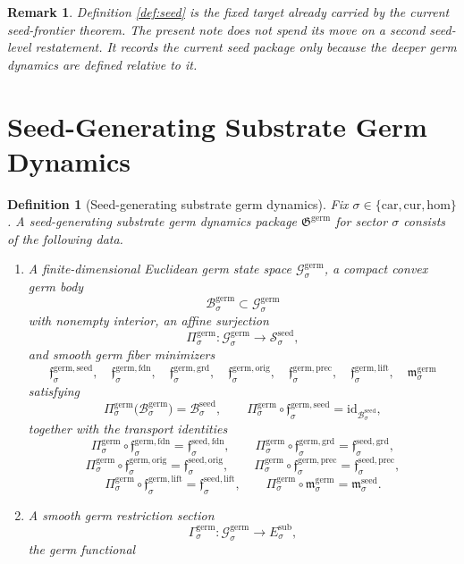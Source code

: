 \documentclass[11pt]{article}
\newcommand{\Car}{\mathrm{car}}
\newcommand{\Cur}{\mathrm{cur}}
\newcommand{\Hom}{\mathrm{hom}}
\newcommand{\SubTarget}[1]{E_{#1}^{\mathrm{sub}}}
\newcommand{\SeedSpace}[1]{\mathcal S_{#1}^{\mathrm{seed}}}
\newcommand{\SeedBody}[1]{\mathcal B_{#1}^{\mathrm{seed}}}
\newcommand{\SeedFoundMin}[1]{\mathfrak f_{#1}^{\mathrm{seed,fdn}}}
\newcommand{\SeedGroundMin}[1]{\mathfrak f_{#1}^{\mathrm{seed,grd}}}
\newcommand{\SeedOrigMin}[1]{\mathfrak f_{#1}^{\mathrm{seed,orig}}}
\newcommand{\SeedPrecMin}[1]{\mathfrak f_{#1}^{\mathrm{seed,prec}}}
\newcommand{\SeedLiftMin}[1]{\mathfrak f_{#1}^{\mathrm{seed,lift}}}
\newcommand{\SeedSubMin}[1]{\mathfrak m_{#1}^{\mathrm{seed}}}
\newcommand{\GermPackage}{\mathfrak G^{\mathrm{germ}}}
\newcommand{\GermSpace}[1]{\mathcal G_{#1}^{\mathrm{germ}}}
\newcommand{\GermBody}[1]{\mathcal B_{#1}^{\mathrm{germ}}}
\newcommand{\GermProj}[1]{\Pi_{#1}^{\mathrm{germ}}}
\newcommand{\GermSeedMin}[1]{\mathfrak f_{#1}^{\mathrm{germ,seed}}}
\newcommand{\GermFoundMin}[1]{\mathfrak f_{#1}^{\mathrm{germ,fdn}}}
\newcommand{\GermGroundMin}[1]{\mathfrak f_{#1}^{\mathrm{germ,grd}}}
\newcommand{\GermOrigMin}[1]{\mathfrak f_{#1}^{\mathrm{germ,orig}}}
\newcommand{\GermPrecMin}[1]{\mathfrak f_{#1}^{\mathrm{germ,prec}}}
\newcommand{\GermLiftMin}[1]{\mathfrak f_{#1}^{\mathrm{germ,lift}}}
\newcommand{\GermSubMin}[1]{\mathfrak m_{#1}^{\mathrm{germ}}}
\newcommand{\GermSection}[1]{\Gamma_{#1}^{\mathrm{germ}}}
\newtheorem{definition}{Definition}
\newtheorem{remark}{Remark}
\begin{document}
\begin{remark}
Definition \ref{def:seed} is the fixed target already carried by the current seed-frontier theorem. The present note does not spend its move on a second seed-level restatement. It records the current seed package only because the deeper germ dynamics are defined relative to it.
\end{remark}

\section{Seed-Generating Substrate Germ Dynamics}

\begin{definition}[Seed-generating substrate germ dynamics]
\label{def:germ}
Fix \(\sigma\in\{\Car,\Cur,\Hom\}\). A seed-generating substrate germ dynamics package \(\GermPackage\) for sector \(\sigma\) consists of the following data.
\begin{enumerate}
    \item A finite-dimensional Euclidean germ state space \(\GermSpace{\sigma}\), a compact convex germ body
    \[
    \GermBody{\sigma}\subset\GermSpace{\sigma}
    \]
    with nonempty interior, an affine surjection
    \[
    \GermProj{\sigma}:\GermSpace{\sigma}\to\SeedSpace{\sigma},
    \]
    and smooth germ fiber minimizers
    \[
    \GermSeedMin{\sigma},\quad
    \GermFoundMin{\sigma},\quad
    \GermGroundMin{\sigma},\quad
    \GermOrigMin{\sigma},\quad
    \GermPrecMin{\sigma},\quad
    \GermLiftMin{\sigma},\quad
    \GermSubMin{\sigma}
    \]
    satisfying
    \[
    \GermProj{\sigma}\bigl(\GermBody{\sigma}\bigr)=\SeedBody{\sigma},
    \qquad
    \GermProj{\sigma}\circ\GermSeedMin{\sigma}
    =
    \mathrm{id}_{\SeedBody{\sigma}},
    \]
    together with the transport identities
    \[
    \GermProj{\sigma}\circ\GermFoundMin{\sigma}
    =
    \SeedFoundMin{\sigma},
    \qquad
    \GermProj{\sigma}\circ\GermGroundMin{\sigma}
    =
    \SeedGroundMin{\sigma},
    \]
    \[
    \GermProj{\sigma}\circ\GermOrigMin{\sigma}
    =
    \SeedOrigMin{\sigma},
    \qquad
    \GermProj{\sigma}\circ\GermPrecMin{\sigma}
    =
    \SeedPrecMin{\sigma},
    \]
    \[
    \GermProj{\sigma}\circ\GermLiftMin{\sigma}
    =
    \SeedLiftMin{\sigma},
    \qquad
    \GermProj{\sigma}\circ\GermSubMin{\sigma}
    =
    \SeedSubMin{\sigma}.
    \]
    \item A smooth germ restriction section
    \[
    \GermSection{\sigma}:\GermSpace{\sigma}\to\SubTarget{\sigma},
    \]
    the germ functional
    \[
\]
\end{enumerate}
\end{definition}
\end{document}
